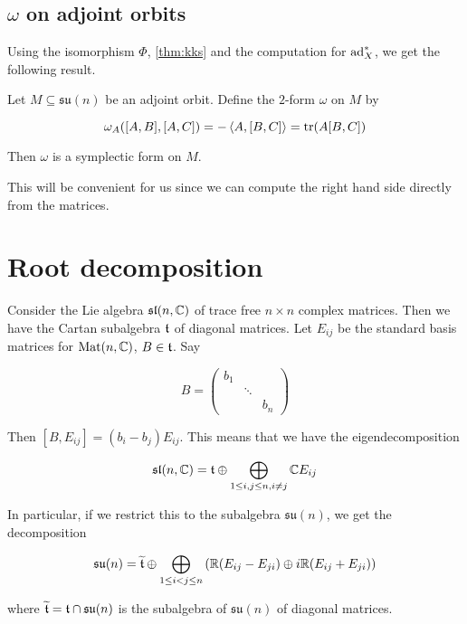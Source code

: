 \documentclass{article}
\newcommand{\su}{\mathfrak{su}}
\renewcommand{\sl}{\mathfrak{sl}}
\renewcommand{\tilde}{\widetilde}
\begin{document}
\subsection{\(\omega\) on adjoint orbits}

Using the isomorphism \(\Phi\), \cref{thm:kks} and the computation for \(\operatorname{ad}_X^*\), we get the following result.

\begin{theorem}
    Let \(M \subseteq \su(n)\) be an adjoint orbit. Define the \(2\)-form \(\omega\) on \(M\) by

    \[\omega_A([A, B], [A, C]) = -\left\langle A, [B, C] \right\rangle = \tr(A[B, C])\]

    Then \(\omega\) is a symplectic form on \(M\).
\end{theorem}

This will be convenient for us since we can compute the right hand side directly from the matrices.

\section{Root decomposition}

Consider the Lie algebra \(\sl(n, \C)\) of trace free \(n \times n\) complex matrices. Then we have the Cartan subalgebra \(\mathfrak{t}\) of diagonal matrices. Let \(E_{ij}\) be the standard basis matrices for \(\operatorname{Mat}(n, \mathbb{C})\), \(B \in \mathfrak{t}\). Say

\[B = \begin{pmatrix}
    b_1 \\
    & \ddots \\
    & & b_n
\end{pmatrix}\]

Then \([B, E_{ij}] = (b_i - b_j)E_{ij}\). This means that we have the eigendecomposition

\begin{equation}
    \label{eq:sln-root}
    \sl(n, \C) = \mft \oplus \bigoplus_{1 \le i, j \le n, i \ne j} \C E_{ij}
\end{equation}

In particular, if we restrict this to the subalgebra \(\su(n)\), we get the decomposition

\begin{equation}
    \label{eq:sun-root}
    \su(n) = \tilde\mft \oplus \bigoplus_{1 \le i < j \le n} \left(\R(E_{ij} - E_{ji}) \oplus i\R (E_{ij} + E_{ji})\right)
\end{equation}

where \(\tilde \mft = \mft \cap \su(n)\) is the subalgebra of \(\su(n)\) of diagonal matrices. 
\end{document}
